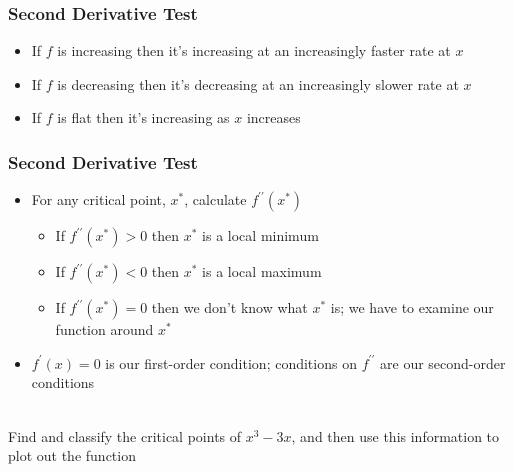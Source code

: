 \documentclass[aspectratio=169, handout]{beamer}
\numberwithin{equation}{section}
\begin{document}
\begin{frame}
\frametitle{Second Derivative Test}

\begin{itemize}

\item[A] If $f$ is increasing then it's increasing at an increasingly faster rate at $x$ \pause
\item[B] If $f$ is decreasing then it's decreasing at an increasingly slower rate at $x$ \pause
\item[C] If $f$ is flat then it's increasing as $x$ increases

\end{itemize}

\vspace{.2in}
\begin{center}
\end{center}

\end{frame}



\begin{frame}
\frametitle{Second Derivative Test}

\begin{itemize}
\item For any critical point, $x^*$, calculate $f^{\prime\prime}(x^*)$ \pause

\begin{itemize}
\item If $f^{\prime\prime}(x^*)>0$ then $x^*$ is a local minimum \pause
\item If $f^{\prime\prime}(x^*)<0$ then $x^*$ is a local maximum \pause

\item If $f^{\prime\prime}(x^*)=0$ then we don't know what $x^*$ is; we have to examine our function around $x^*$ \pause

\end{itemize}

\item $f^\prime(x)=0$ is our first-order condition; conditions on $f^{\prime\prime}$ are our second-order conditions \pause

\end{itemize}

\ \\Find and classify the critical points of $x^3-3x$, and then use this information to plot out the function

\end{frame}
\end{document}
